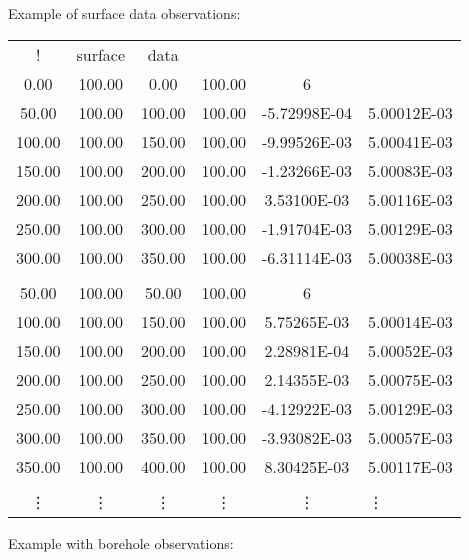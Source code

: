 Example of surface data observations:
\begin{fileExample}
\begin{tabular}{|cccccl|}
\hline
! & surface & data & & & \\
0.00 & 100.00 & 0.00 & 100.00 &	6 & \\
50.00	&  100.00 & 100.00	& 100.00	&	-5.72998E-04	&	5.00012E-03\\
100.00	&	100.00	&	150.00	& 100.00 &	-9.99526E-03	&	5.00041E-03\\
150.00	&	100.00	&	200.00	&	100.00	&	-1.23266E-03	&	5.00083E-03\\
200.00	&	100.00	&	250.00	&	100.00	&	3.53100E-03	&	5.00116E-03\\
250.00	&	100.00	&	300.00	&	100.00	&	-1.91704E-03	&	5.00129E-03\\
300.00	&	100.00	&	350.00	&	100.00	&	-6.31114E-03	&	5.00038E-03\\
 &  &  &  &  & \\
50.00	& 100.00	&	50.00	& 100.00	& 6 & \\
100.00	&	100.00	&	150.00	&	100.00	&	5.75265E-03	&	5.00014E-03\\
150.00	&	100.00	&	200.00	&	100.00	&	2.28981E-04	&	5.00052E-03\\
200.00	&	100.00	&	250.00	&	100.00	&	2.14355E-03	&	5.00075E-03\\
250.00	&	100.00	&	300.00	&	100.00	&	-4.12922E-03	&	5.00129E-03\\
300.00	&	100.00	&	350.00	&	100.00	&	-3.93082E-03	&	5.00057E-03\\
350.00	&	100.00	&	400.00	&	100.00	&	8.30425E-03	&	5.00117E-03\\
 &  &  &  &  & \\
\vdots & \vdots & \vdots & \vdots & \vdots & \vdots \\
\hline
\end{tabular}
\end{fileExample}
%
Example with borehole observations:
